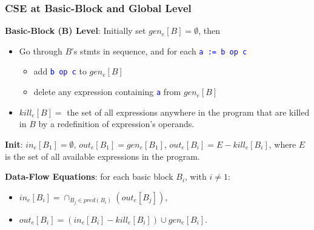 \documentclass{beamer}
\newcommand{\blue}[1]{\textcolor{Blue}{{#1}}}
\renewcommand{\emph}[1]{\textcolor{structure}{#1}}
\begin{document}
\begin{frame}[fragile,t]
    \frametitle{CSE at Basic-Block and Global Level}

\emph{\bf Basic-Block (B) Level}: Initially set $gen_e[B] = \emptyset$, then\smallskip

\begin{itemize}
    \item Go through $B$'s stmts in sequence, and for each \blue{\tt a := b op c}
        \begin{itemize}
            \item add \blue{\tt b op c} to $gen_e[B]$\smallskip
            \item delete any expression containing \blue{\tt a} from $gen_e[B]$\smallskip
        \end{itemize}
    \item $kill_e[B] =$ the set of all expressions anywhere in the program that
            are killed in $B$ by a redefinition of expression's operands.
\end{itemize}

\bigskip

\emph{\bf Init}: $in_e[B_1] = \emptyset$, $out_e[B_1] = gen_e[B_1]$, $out_e[B_i] = E - kill_e[B_i]$,
where $E$ is the set of all available expressions in the program.

\bigskip

\emph{\bf Data-Flow Equations}: for each basic block $B_i$, with $i \not= 1$:\smallskip

\begin{itemize}
    \item $in_e[B_i] = \cap_{B_j\in pred(B_i)}(out_e[B_j])$,\smallskip

    \item $out_e[B_i] = (in_e[B_i] - kill_e[B_i]) \cup gen_e[B_i]$.
\end{itemize}

\end{frame}
\end{document}
